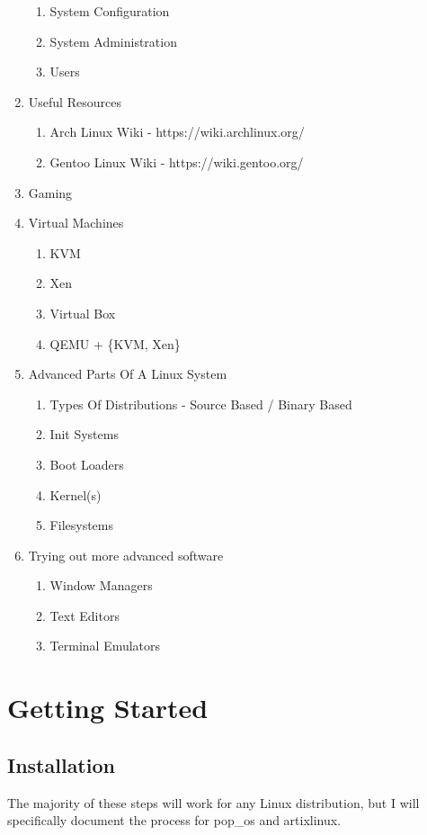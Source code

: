\documentclass {report}
\begin{document}
\begin{enumerate}
\begin{enumerate}
      \item System Configuration
      \item System Administration
      \item Users
    \end{enumerate}
  \item Useful Resources
    \begin{enumerate}
      \item Arch Linux Wiki - https://wiki.archlinux.org/
      \item Gentoo Linux Wiki - https://wiki.gentoo.org/
    \end{enumerate}
  \item Gaming
  \item Virtual Machines
    \begin{enumerate}
      \item KVM
      \item Xen
      \item Virtual Box
      \item QEMU + \{KVM, Xen\}
    \end{enumerate}
  \item Advanced Parts Of A Linux System
    \begin{enumerate}
      \item Types Of Distributions - Source Based / Binary Based
      \item Init Systems
      \item Boot Loaders
      \item Kernel(s)
      \item Filesystems
    \end{enumerate}
  \item Trying out more advanced software
    \begin{enumerate}
      \item Window Managers
      \item Text Editors
      \item Terminal Emulators
    \end{enumerate}
\end{enumerate}

\chapter{Getting Started}
\section{Installation}
The majority of these steps will work for any Linux distribution, but I will specifically document the process for pop\_os and artixlinux.
\end{document}
